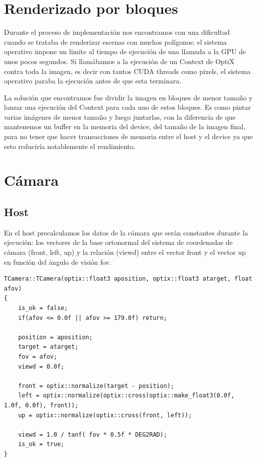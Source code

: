 \clearpage

\section{Renderizado por bloques}

Durante el proceso de implementación nos encontramos con una dificultad cuando se trataba de renderizar escenas con muchos polígonos: el sistema operativo impone un limite al tiempo de ejecución de una llamada a la GPU de unos pocos segundos. Si llamábamos a la ejecución de un Context de OptiX contra toda la imagen, es decir con tantos CUDA threads como pixels, el sistema operativo paraba la ejecución antes de que esta terminara.

\medskip

La solución que encontramos fue dividir la imagen en bloques de menor tamaño y lanzar una ejecución del Context para cada uno de estos bloques. Es como pintar varias imágenes de menor tamaño y luego juntarlas, con la diferencia de que mantenemos un buffer en la memoria del device, del tamaño de la imagen final, para no tener que hacer transacciones de memoria entre el host y el device ya que esto reduciría notablemente el rendimiento.

\clearpage

\section{Cámara}

\subsection{Host}

En el host precalculamos los datos de la cámara que serán constantes durante la ejecución: los vectores de la base ortonormal del sistema de coordenadas de cámara (front, left, up) y la relación (viewd) entre el vector front y el vector up en función del ángulo de visión fov.

\begin{lstlisting}
TCamera::TCamera(optix::float3 aposition, optix::float3 atarget, float afov)
{
	is_ok = false;
	if(afov <= 0.0f || afov >= 179.0f) return;

	position = aposition;
	target = atarget;
	fov = afov;
	viewd = 0.0f;

	front = optix::normalize(target - position);
	left = optix::normalize(optix::cross(optix::make_float3(0.0f, 1.0f, 0.0f), front));
	up = optix::normalize(optix::cross(front, left));

	viewd = 1.0 / tanf( fov * 0.5f * DEG2RAD);
	is_ok = true;		
}
\end{lstlisting}


